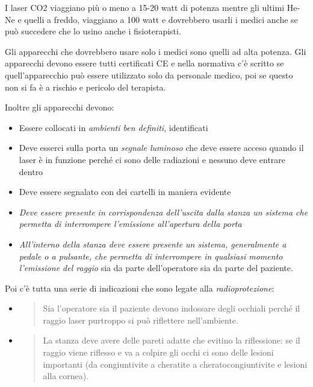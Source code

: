 \documentclass[]{article}
\begin{document}
I laser CO2 viaggiano più o meno a 15-20 watt di potenza mentre gli
ultimi He-Ne e quelli a freddo, viaggiano a 100 watt e dovrebbero usarli
i medici anche se può succedere che lo usino anche i fisioterapisti.

Gli apparecchi che dovrebbero usare solo i medici sono quelli ad alta
potenza. Gli apparecchi devono essere tutti certificati CE e nella
normativa c'è scritto se quell'apparecchio può essere utilizzato solo da
personale medico, poi se questo non si fa è a rischio e pericolo del
terapista.

Inoltre gli apparecchi devono:

\begin{itemize}
\item
  Essere collocati in \emph{ambienti ben definiti}, identificati
\item
  Deve esserci sulla porta un \emph{segnale luminoso} che deve essere
  acceso quando il laser è in funzione perché ci sono delle radiazioni e
  nessuno deve entrare dentro
\item
  Deve essere segnalato con dei cartelli in maniera evidente
\item
  \emph{Deve essere presente in corrispondenza dell'uscita dalla stanza
  un sistema che permetta di interrompere l'emissione all'apertura della
  porta}
\item
  \emph{All'interno della stanza deve essere presente un sistema,
  generalmente a pedale o a pulsante, che permetta di interrompere in
  qualsiasi momento l'emissione del raggio} sia da parte dell'operatore
  sia da parte del paziente.
\end{itemize}

Poi c'è tutta una serie di indicazioni che sono legate alla
\emph{radioprotezione}:

\begin{itemize}
\item
  \begin{quote}
  Sia l'operatore sia il paziente devono indossare degli occhiali perché
  il raggio laser purtroppo si può riflettere nell'ambiente.
  \end{quote}
\item
  \begin{quote}
  La stanza deve avere delle pareti adatte che evitino la riflessione:
  se il raggio viene riflesso e va a colpire gli occhi ci sono delle
  lesioni importanti (da congiuntivite a cheratite a
  cheratocongiuntivite e lesioni alla cornea).
  \end{quote}
\end{itemize}
\end{document}
